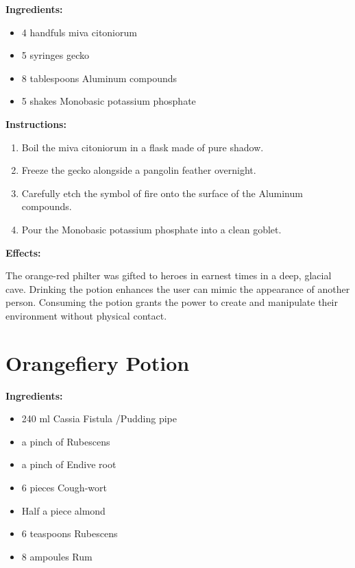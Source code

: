\documentclass{article}
\begin{document}
\textbf{Ingredients:}

\begin{itemize}
  \item 4 handfuls miva citoniorum
  \item 5 syringes gecko
  \item 8 tablespoons Aluminum compounds
  \item 5 shakes Monobasic potassium phosphate
\end{itemize}

\textbf{Instructions:}

\begin{enumerate}
  \item Boil the miva citoniorum in a flask made of pure shadow.
  \item Freeze the gecko alongside a pangolin feather overnight.
  \item Carefully etch the symbol of fire onto the surface of the Aluminum compounds.
  \item Pour the Monobasic potassium phosphate into a clean goblet.
\end{enumerate}

\textbf{Effects:}

The orange-red philter was gifted to heroes in earnest times in a deep, glacial cave. Drinking the potion enhances the user can mimic the appearance of another person. Consuming the potion grants the power to create and manipulate their environment without physical contact.

\newpage
\section*{Orangefiery Potion}

\textbf{Ingredients:}

\begin{itemize}
  \item 240 ml Cassia Fistula /Pudding pipe
  \item a pinch of Rubescens
  \item a pinch of Endive root
  \item 6 pieces Cough-wort
  \item Half a piece almond
  \item 6 teaspoons Rubescens
  \item 8 ampoules Rum
\end{itemize}
\end{document}
